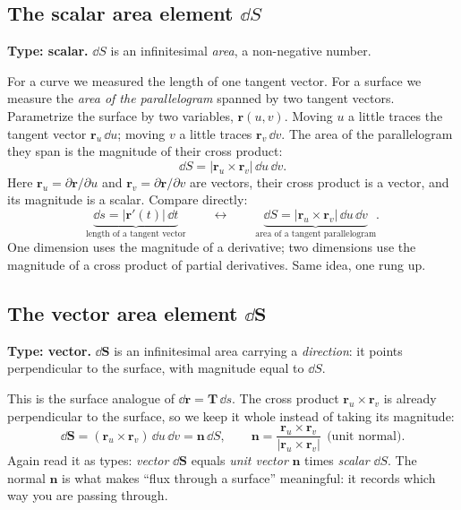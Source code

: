 \documentclass{essay}
\newcommand{\rr}{\mathbf{r}}
\newcommand{\nn}{\mathbf{n}}
\newcommand{\TT}{\mathbf{T}}
\begin{document}
\subsection{The scalar area element \(\dd S\)}

\textbf{Type: scalar.} \(\dd S\) is an infinitesimal \emph{area}, a non-negative
number.

For a curve we measured the length of one tangent vector. For a surface we measure
the \emph{area of the parallelogram} spanned by two tangent vectors. Parametrize the
surface by two variables, \(\rr(u,v)\). Moving \(u\) a little traces the tangent vector
\(\rr_{u}\,\dd u\); moving \(v\) a little traces \(\rr_{v}\,\dd v\). The area of the
parallelogram they span is the magnitude of their cross product:
\[ \dd S = \bigl\lvert \rr_{u} \times \rr_{v} \bigr\rvert \,\dd u\,\dd v . \]
Here \(\rr_{u}=\partial\rr/\partial u\) and \(\rr_{v}=\partial\rr/\partial v\) are vectors,
their cross product is a vector, and its magnitude is a scalar. Compare directly:
\[ \underbrace{\dd s = \lvert\rr'(t)\rvert\,\dd t}_{\text{length of a tangent vector}} \qquad\longleftrightarrow\qquad \underbrace{\dd S = \lvert\rr_{u}\times\rr_{v}\rvert\,\dd u\,\dd v}_{\text{area of a tangent parallelogram}} . \]
One dimension uses the magnitude of a derivative; two dimensions use the magnitude
of a cross product of partial derivatives. Same idea, one rung up.

\subsection{The vector area element \(\dd\mathbf{S}\)}

\textbf{Type: vector.} \(\dd\mathbf{S}\) is an infinitesimal area carrying a
\emph{direction}: it points perpendicular to the surface, with magnitude equal to
\(\dd S\).

This is the surface analogue of \(\dd\mathbf{r}=\TT\,\dd s\). The cross product
\(\rr_{u}\times\rr_{v}\) is already perpendicular to the surface, so we keep it whole
instead of taking its magnitude:
\[ \dd\mathbf{S} = (\rr_{u} \times \rr_{v})\,\dd u\,\dd v = \nn\,\dd S, \qquad \nn = \frac{\rr_{u}\times\rr_{v}}{\lvert\rr_{u}\times\rr_{v}\rvert}\ \ \text{(unit normal).} \]
Again read it as types: \emph{vector} \(\dd\mathbf{S}\) equals \emph{unit vector}
\(\nn\) times \emph{scalar} \(\dd S\). The normal \(\nn\) is what makes ``flux through a
surface'' meaningful: it records which way you are passing through.
\end{document}
